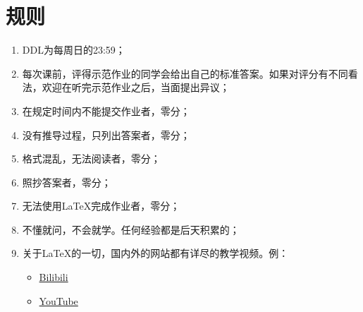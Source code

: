 \documentclass[12pt,hyperref,a4paper,UTF8]{ctexart}
\begin{document}
\cover

%
%

\thispagestyle{empty} %

\newpage
\tableofcontents

\newpage


\section{规则}
\begin{enumerate}[label=\Roman*]
    \item DDL为每周日的23:59；

    \item 每次课前，评得示范作业的同学会给出自己的标准答案。如果对评分有不同看法，欢迎在听完示范作业之后，当面提出异议；
    
    \item 在规定时间内不能提交作业者，零分；

    \item 没有推导过程，只列出答案者，零分；

    \item 格式混乱，无法阅读者，零分；

    \item 照抄答案者，零分；

    \item 无法使用LaTeX完成作业者，零分；

    \item 不懂就问，不会就学。任何经验都是后天积累的；

    \item 关于LaTeX的一切，国内外的网站都有详尽的教学视频。例：
    \begin{itemize}
        \item \href{https://www.bilibili.com/video/BV1Jy4y1p76e/?vd_source=2c0f6624843da61e86c7e8a2b75de875}{Bilibili}

        \item \href{https://www.youtube.com/watch?v=Jp0lPj2-DQA&list=PLHXZ9OQGMqxcWWkx2DMnQmj5os2X5ZR73}{YouTube}
    \end{itemize}
\end{enumerate}
\end{document}
